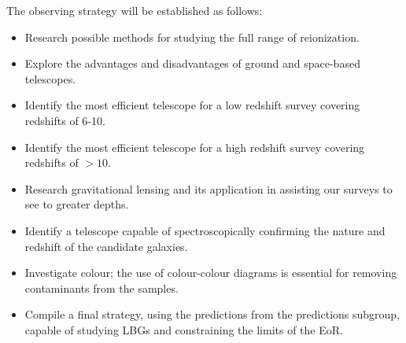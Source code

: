 	The observing strategy will be established as follows:
	\begin{itemize}
		\item Research possible methods for studying the full range of reionization.
		\item Explore the advantages and disadvantages of ground and space-based telescopes.
		\item Identify the most efficient telescope for a low redshift survey covering redshifts of 6-10.
		\item Identify the most efficient telescope for a high redshift survey covering redshifts of $>10$.
		\item Research gravitational lensing and its application in assisting our surveys to see to greater depths.
		\item Identify a telescope capable of spectroscopically confirming the nature and redshift of the candidate galaxies.
		\item Investigate colour; the use of colour-colour diagrams is essential for removing contaminants from the samples.
		\item Compile a final strategy, using the predictions from the predictions subgroup, capable of studying LBGs and constraining the limits of the EoR.
	\end{itemize}
